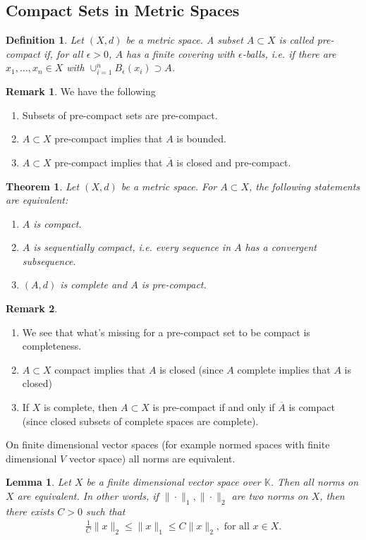 \documentclass[11pt,a4paper]{article}
\newtheorem{lem}{Lemma}[section]
\newtheorem{thm}{Theorem}[section]
\newtheorem{defn}{Definition}[section]
\theoremstyle{definition}
\newtheorem{rem}{Remark}[section]
\begin{document}
\subsection{Compact Sets in Metric Spaces}
\begin{defn} Let $(X,d)$ be a metric space. A subset $A \subset X$ is called pre-compact if, for all $\epsilon >0$, $A$ has a finite covering with $\epsilon$-balls, i.e. if there are $x_1, \dots , x_n \in X$ with $\cup_{i=1}^n B_\epsilon(x_i) \supset A$. 
\end{defn}
\begin{rem} We have the following
\begin{enumerate}
\item Subsets of pre-compact sets are pre-compact.
\item $A \subset X$ pre-compact implies that $A$ is bounded.
\item $A \subset X$ pre-compact implies that $\overline{A}$ is closed and pre-compact. 
\end{enumerate}
\end{rem}
\begin{thm} Let $(X,d)$ be a metric space. For $A \subset X$, the following statements are equivalent:
\begin{enumerate}
\item $A$ is compact.
\item $A$ is sequentially compact, i.e. every sequence in $A$ has a convergent subsequence.
\item $(A,d)$ is complete and $A$ is pre-compact. 
\end{enumerate}
\end{thm}
\newpage
\begin{rem} \ \begin{enumerate}
\item We see that what's missing for a pre-compact set to be compact is completeness. 
\item $A \subset X$ compact implies that $A$ is closed (since $A$ complete implies that $A$ is closed)
\item If $X$ is complete, then $A \subset X$ is pre-compact if and only if $\overline{A}$ is compact (since closed subsets of complete spaces are complete). 
\end{enumerate}
\end{rem}
\noindent On finite dimensional vector spaces (for example normed spaces with finite dimensional $V$ vector space) all norms are equivalent. 
\begin{lem} Let $X$ be a finite dimensional vector space over $\mathbb{K}$. Then all norms on $X$ are equivalent. In other words, if $\| \cdot \|_1,  \| \cdot \|_2$ are two norms on $X$, then there exists $C>0$ such that 
\begin{align*}
\frac{1}{C} \|x\|_2 \leq \|x\|_1 \leq C \|x\|_2, \text{ for all } x \in X. 
\end{align*}
\end{lem}
\end{document}
